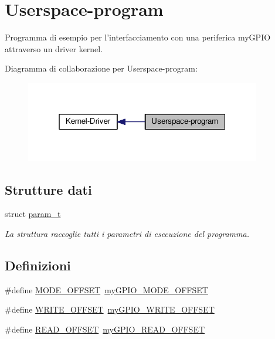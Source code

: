 \hypertarget{group___userspace-program}{\section{Userspace-\/program}
\label{group___userspace-program}
}


Programma di esempio per l'interfacciamento con una periferica my\+G\+P\+I\+O attraverso un driver kernel.  


Diagramma di collaborazione per Userspace-\/program\+:\nopagebreak
\begin{figure}[H]
\begin{center}
\leavevmode
\includegraphics[width=292pt]{group___userspace-program}
\end{center}
\end{figure}
\subsection*{Strutture dati}
\begin{DoxyCompactItemize}
\item 
struct \hyperlink{structparam__t}{param\+\_\+t}
\begin{DoxyCompactList}\small\item\em La struttura raccoglie tutti i parametri di esecuzione del programma. \end{DoxyCompactList}\end{DoxyCompactItemize}
\subsection*{Definizioni}
\begin{DoxyCompactItemize}
\item 
\#define \hyperlink{group___userspace-program_ga7a63b24ca5489eb3206598e3d90fe19c}{M\+O\+D\+E\+\_\+\+O\+F\+F\+S\+E\+T}~\hyperlink{group__my_g_p_i_o_ga81a662103d6ed053978c0a9b4c273065}{my\+G\+P\+I\+O\+\_\+\+M\+O\+D\+E\+\_\+\+O\+F\+F\+S\+E\+T}
\item 
\#define \hyperlink{group___userspace-program_ga77d96306ed0e813f93c4c3f98b970b86}{W\+R\+I\+T\+E\+\_\+\+O\+F\+F\+S\+E\+T}~\hyperlink{group__my_g_p_i_o_ga2e45778b6ca9ce6f5768b3f7a4557ce1}{my\+G\+P\+I\+O\+\_\+\+W\+R\+I\+T\+E\+\_\+\+O\+F\+F\+S\+E\+T}
\item 
\#define \hyperlink{group___userspace-program_gad32c3a5b42163e171daccde5b5d5de02}{R\+E\+A\+D\+\_\+\+O\+F\+F\+S\+E\+T}~\hyperlink{group__my_g_p_i_o_ga584d2dfece76e5762030d918d80592cc}{my\+G\+P\+I\+O\+\_\+\+R\+E\+A\+D\+\_\+\+O\+F\+F\+S\+E\+T}
\end{DoxyCompactItemize}
